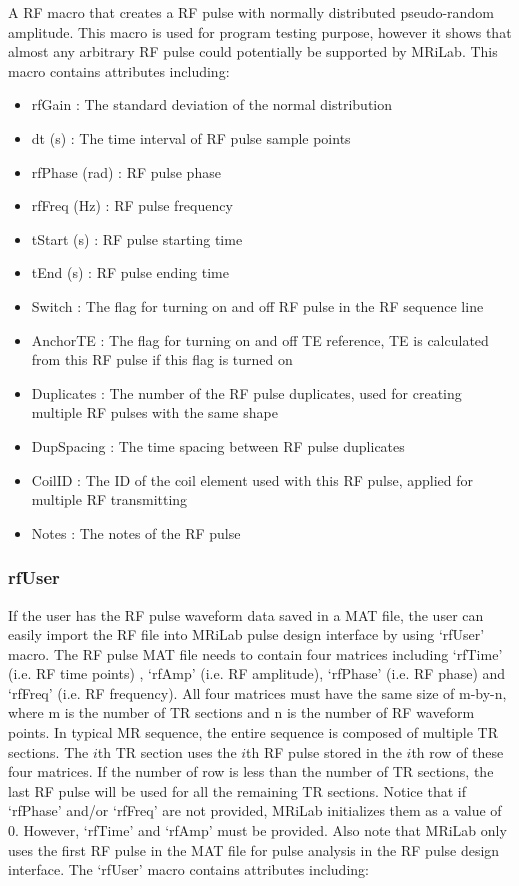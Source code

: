 \documentclass{book}%
\begin{document}
A RF macro that creates a RF pulse with normally distributed pseudo-random amplitude. This macro is used for program testing purpose, however it shows that almost any arbitrary RF pulse could potentially be supported by MRiLab. This macro contains attributes including:

\begin{itemize}
	\item rfGain : The standard deviation of the normal distribution
	\item dt (s) : The time interval of RF pulse sample points
	\item rfPhase (rad) : RF pulse phase
	\item rfFreq (Hz) : RF pulse frequency
	\item tStart (s) : RF pulse starting time
	\item tEnd (s) : RF pulse ending time
	\item Switch : The flag for turning on and off RF pulse in the RF sequence line
	\item AnchorTE : The flag for turning on and off TE reference, TE is calculated from this RF pulse if this flag is turned on
	\item Duplicates : The number of the RF pulse duplicates, used for creating multiple RF pulses with the same shape
	\item DupSpacing : The time spacing between RF pulse duplicates
	\item CoilID : The ID of the coil element used with this RF pulse, applied for multiple RF transmitting
	\item Notes : The notes of the RF pulse 
\end{itemize}

\subsubsection{rfUser}

If the user has the RF pulse waveform data saved in a MAT file, the user can easily import the RF file into MRiLab pulse design interface by using `rfUser' macro. The RF pulse MAT file needs to contain four matrices including `rfTime' (i.e. RF time points) , `rfAmp' (i.e. RF amplitude), `rfPhase' (i.e. RF phase) and `rfFreq' (i.e. RF frequency). All four matrices must have the same size of m-by-n, where m is the number of TR sections and n is the number of RF waveform points. In typical MR sequence, the entire sequence is composed of multiple TR sections. The $i$th TR section uses the $i$th RF pulse stored in the $i$th row of these four matrices. If the number of row is less than the number of TR sections, the last RF pulse will be used for all the remaining TR sections. Notice that if `rfPhase' and/or `rfFreq' are not provided, MRiLab initializes them as a value of 0. However, `rfTime' and `rfAmp' must be provided. Also note that MRiLab only uses the first RF pulse in the MAT file for pulse analysis in the RF pulse design interface. The `rfUser' macro contains attributes including:
\end{document}
